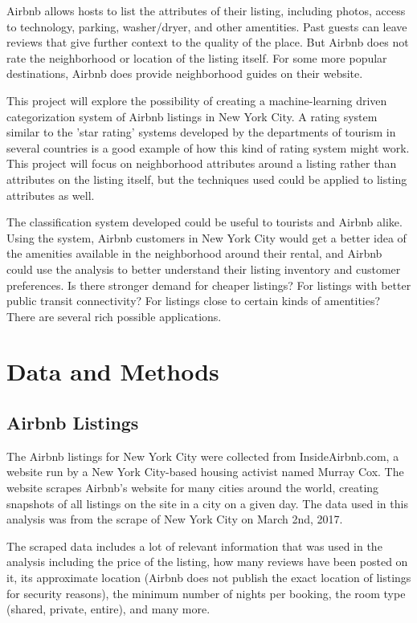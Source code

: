 \documentclass[conference]{IEEEtran}
\begin{document}
Airbnb allows hosts to list the attributes of their listing, including photos, access to
technology, parking, washer/dryer, and other amentities. Past guests can leave reviews
that give further context to the quality of the place. But Airbnb does not rate the neighborhood
or location of the listing itself. For some more popular destinations, Airbnb does provide
neighborhood guides on their website.

This project will explore the possibility of creating a machine-learning driven
categorization system of Airbnb listings in New York City. A rating system similar to
the 'star rating' systems developed by the departments of tourism in several countries
is a good example of how this kind of rating system might work. This project will focus
on neighborhood attributes around a listing rather than attributes on the listing itself,
but the techniques used could be applied to listing attributes as well.

The classification system developed could be useful to tourists and Airbnb alike.
Using the system, Airbnb customers in New York City would get a better idea of the amenities available
in the neighborhood around their rental, and Airbnb could use the analysis to better understand
their listing inventory and customer preferences. Is there stronger demand for cheaper listings?
For listings with better public transit connectivity? For listings close to certain
kinds of amentities? There are several rich possible applications.

\section{Data and Methods}

\subsection{Airbnb Listings}
The Airbnb listings for New York City were collected from InsideAirbnb.com,\cite{insideairbnb} a
website run by a New York City-based housing activist named Murray Cox. The website
scrapes Airbnb's website for many cities around the world, creating snapshots of all
listings on the site in a city on a given day. The data used in this analysis was from the
scrape of New York City on March 2nd, 2017.

The scraped data includes a lot of relevant information that was used in the analysis
including the price of the listing, how many reviews have been posted on it, its
approximate location (Airbnb does not publish the exact location of listings for security
reasons), the minimum number of nights per booking, the room type (shared, private, entire), and
many more.
\end{document}
